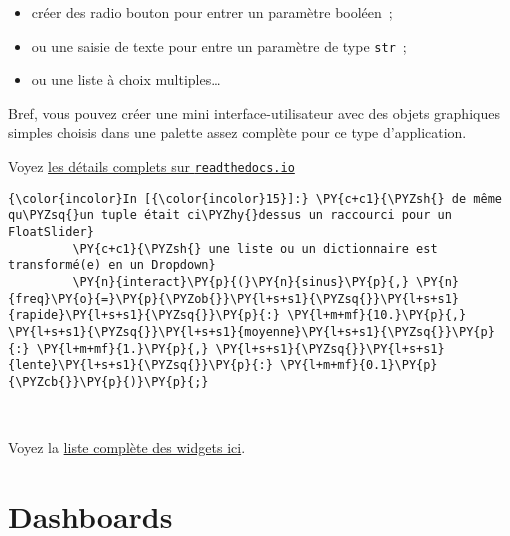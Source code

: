 \begin{itemize}
\tightlist
\item
  créer des radio bouton pour entrer un paramètre booléen~;
\item
  ou une saisie de texte pour entre un paramètre de type \texttt{str}~;
\item
  ou une liste à choix multiples\ldots{}
\end{itemize}

Bref, vous pouvez créer une mini interface-utilisateur avec des objets
graphiques simples choisis dans une palette assez complète pour ce type
d'application.

Voyez
\href{http://ipywidgets.readthedocs.io/en/latest/examples/Using\%20Interact.html}{les
détails complets sur \texttt{readthedocs.io}}

    \begin{Verbatim}[commandchars=\\\{\},frame=single,framerule=0.3mm,rulecolor=\color{cellframecolor}]
{\color{incolor}In [{\color{incolor}15}]:} \PY{c+c1}{\PYZsh{} de même qu\PYZsq{}un tuple était ci\PYZhy{}dessus un raccourci pour un FloatSlider}
         \PY{c+c1}{\PYZsh{} une liste ou un dictionnaire est transformé(e) en un Dropdown}
         \PY{n}{interact}\PY{p}{(}\PY{n}{sinus}\PY{p}{,} \PY{n}{freq}\PY{o}{=}\PY{p}{\PYZob{}}\PY{l+s+s1}{\PYZsq{}}\PY{l+s+s1}{rapide}\PY{l+s+s1}{\PYZsq{}}\PY{p}{:} \PY{l+m+mf}{10.}\PY{p}{,} \PY{l+s+s1}{\PYZsq{}}\PY{l+s+s1}{moyenne}\PY{l+s+s1}{\PYZsq{}}\PY{p}{:} \PY{l+m+mf}{1.}\PY{p}{,} \PY{l+s+s1}{\PYZsq{}}\PY{l+s+s1}{lente}\PY{l+s+s1}{\PYZsq{}}\PY{p}{:} \PY{l+m+mf}{0.1}\PY{p}{\PYZcb{}}\PY{p}{)}\PY{p}{;}
\end{Verbatim}


    \begin{center}
    \end{center}
    { \hspace*{\fill} \\}
    
    Voyez la
\href{http://ipywidgets.readthedocs.io/en/latest/examples/Widget\%20List.html}{liste
complète des widgets ici}.

    \hypertarget{dashboards}{%
\section{Dashboards}\label{dashboards}}

